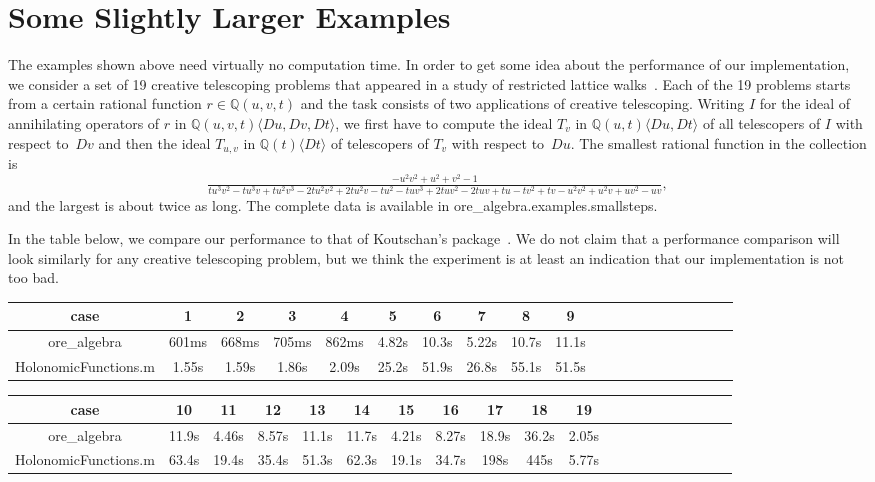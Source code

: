 \documentclass[11pt]{article}
\def\<#1>{\langle#1\rangle}
\let\set\mathbb
\begin{document}
\section{Some Slightly Larger Examples}

The examples shown above need virtually no computation time. In order to get some idea about the performance of our
implementation, we consider a set of 19 creative telescoping problems that appeared in a study of restricted lattice
walks~\cite{bostan16b}.
Each of the 19 problems starts from a certain rational function $r\in\set Q(u,v,t)$ and the task consists of two
applications of creative telescoping. Writing $I$ for the ideal of annihilating operators of $r$ in $\set Q(u,v,t)\<Du,Dv,Dt>$,
we first have to compute the ideal $T_v$ in $\set Q(u,t)\<Du,Dt>$ of all telescopers of $I$ with respect to~$Dv$ and then
the ideal $T_{u,v}$ in $\set Q(t)\<Dt>$ of telescopers of $T_v$ with respect to~$Du$. The smallest rational function in
the collection is
\[
\tfrac{-u^2 v^2+u^2+v^2-1}{t u^3 v^2-t u^3 v+t u^2 v^3-2 t u^2 v^2+2 t u^2 v-t u^2-t u v^3+2 t u v^2-2 t
  u v+t u-t v^2+t v-u^2 v^2+u^2 v+u v^2-u v},
\]
and the largest is about twice as long. The complete data is available in ore\_algebra.examples.smallsteps.

In the table below, we compare our performance to that of Koutschan's package~\cite{koutschan10c}. We do not claim that a
performance comparison will look similarly for any creative telescoping problem, but we think the experiment is at least
an indication that our implementation is not too bad.

\begin{center}
  \begin{tabular}{c|ccccccccccccccccccc}
    case & 1 & 2 & 3 & 4 & 5 & 6 & 7 & 8 & 9  \\\hline
    ore\_algebra & 601ms & 668ms & 705ms & 862ms & 4.82s & 10.3s & 5.22s & 10.7s & 11.1s \\
    HolonomicFunctions.m & 1.55s & 1.59s & 1.86s & 2.09s & 25.2s & 51.9s & 26.8s & 55.1s & 51.5s
  \end{tabular}

  \begin{tabular}{c|ccccccccccccccccccc}
    case & 10 & 11 & 12 & 13 & 14 & 15 & 16 & 17 & 18 & 19 \\\hline
    ore\_algebra & 11.9s & 4.46s & 8.57s & 11.1s & 11.7s & 4.21s & 8.27s & 18.9s & 36.2s & 2.05s \\
    HolonomicFunctions.m & 63.4s & 19.4s & 35.4s & 51.3s & 62.3s & 19.1s & 34.7s & 198s & 445s & 5.77s
  \end{tabular}
\end{center}

\small


\end{document}
